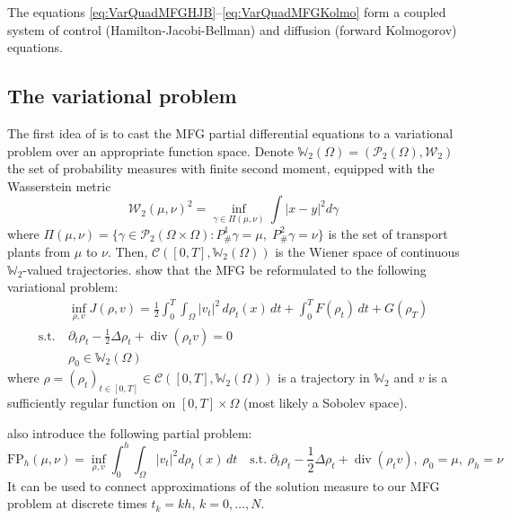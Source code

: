 \documentclass{article}
\newcommand{\WW}{\mathbb{W}}
\newcommand{\calC}{\mathcal{C}}
\newcommand{\calP}{\mathcal{P}}
\newcommand{\calW}{\mathcal{W}}
\newcommand{\suchthat}{\mathrm{s.t.}}
\DeclareMathOperator{\divg}{div}
\begin{document}
    The equations \eqref{eq:VarQuadMFGHJB}--\eqref{eq:VarQuadMFGKolmo} form a coupled system of control (Hamilton-Jacobi-Bellman) and diffusion (forward Kolmogorov) equations.
    
    \subsection{The variational problem}
    
    The first idea of \cite{benamou:hal-01295299} is to cast the MFG partial differential equations to a variational problem over an appropriate function space. Denote $\WW_2(\Omega) = (\calP_2(\Omega), \calW_2)$ the set of probability measures with finite second moment, equipped with the Wasserstein metric
    \begin{equation}\label{eq:Wasserstein2Metric}
    	\calW_2(\mu,\nu)^2 = \inf_{\gamma\in\Pi(\mu,\nu)}
    	\int {|x-y|}^2 d\gamma
    \end{equation}
    where $\Pi(\mu,\nu) =\{ \gamma \in \calP_2(\Omega\times\Omega) : P^1_{\#}\gamma = \mu,\; P^2_{\#}\gamma = \nu \}$ is the set of transport plants from $\mu$ to $\nu$.
    Then, $\mathcal{C}([0, T], \WW_2(\Omega))$ is the Wiener space of continuous $\WW_2$-valued trajectories.
    \textcite{benamou:hal-01295299} show that the MFG be reformulated to the following variational problem:
    \begin{subequations}\label{eq:EulerianProblem}
    \begin{align}
    	&\inf_{\rho,v} J(\rho, v) =
    	\frac{1}{2}\int_0^T\int_\Omega |v_t|^2 \,d\rho_t(x)\,dt + \int_0^T F(\rho_t)\,dt + G(\rho_T)
    	\\
    	\suchthat\ &\partial_t \rho_t - \frac12\Delta \rho_t + \divg(\rho_t v) = 0 \\
    	&\rho_0 \in \WW_2(\Omega)	
    \end{align}
	\end{subequations}
	where $\rho = (\rho_t)_{t\in[0,T]}\in \calC([0,T], \WW_2(\Omega))$ is a trajectory in $\WW_2$ and $v$ is a sufficiently regular function on $[0,T] \times \Omega$ (most likely a Sobolev space).
	
	\textcite{benamou2018entropy} also introduce the following partial problem:
	\begin{equation}\label{eq:FPhPartial}
		\mathrm{FP}_h(\mu,\nu) =
		\inf_{\rho, v} \int_0^h\int_\Omega |v_t|^2 d\rho_t(x)\,dt
		\quad \suchthat\;
		\partial_t\rho_t -\frac12\Delta\rho_t + \divg(\rho_tv),\;
		\rho_0 = \mu,\; \rho_h = \nu
	\end{equation}
	It can be used to connect approximations of the solution measure to our MFG problem at discrete times $t_k = kh$, $k=0,\ldots,N$.
	
\end{document}
